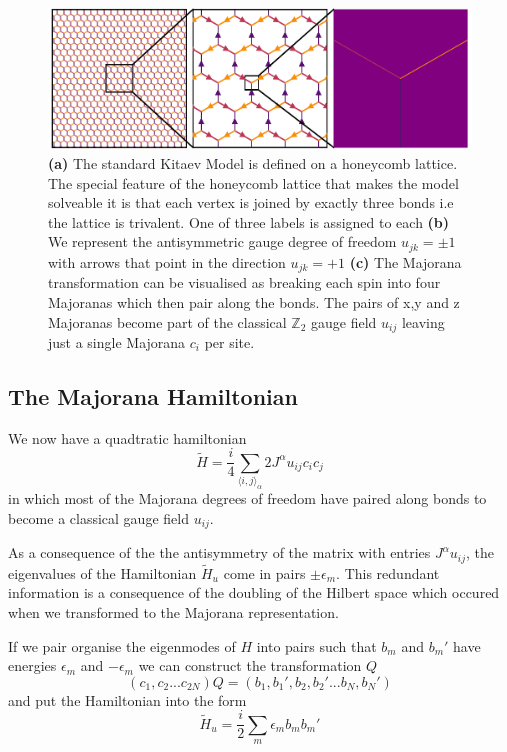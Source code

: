 \begin{figure}
\hypertarget{fig:intro_figure_template}{%
\centering
\includegraphics{figure_code/amk_chapter/honeycomb_zoom/intro_figure_template.pdf}
\caption{\textbf{(a)} The standard Kitaev Model is defined on a
honeycomb lattice. The special feature of the honeycomb lattice that
makes the model solveable it is that each vertex is joined by exactly
three bonds i.e the lattice is trivalent. One of three labels is
assigned to each \textbf{(b)} We represent the antisymmetric gauge
degree of freedom \(u_{jk} = \pm 1\) with arrows that point in the
direction \(u_{jk} = +1\) \textbf{(c)} The Majorana transformation can
be visualised as breaking each spin into four Majoranas which then pair
along the bonds. The pairs of x,y and z Majoranas become part of the
classical \(\mathbb{Z}_2\) gauge field \(u_{ij}\) leaving just a single
Majorana \(c_i\) per site.}\label{fig:intro_figure_template}
}
\end{figure}

\hypertarget{the-majorana-hamiltonian}{%
\subsection{The Majorana Hamiltonian}\label{the-majorana-hamiltonian}}

We now have a quadtratic hamiltonian
\[ \tilde{H} =  \frac{i}{4} \sum_{\langle i,j\rangle_\alpha} 2J^{\alpha} u_{ij} c_i c_j\]
in which most of the Majorana degrees of freedom have paired along bonds
to become a classical gauge field \(u_{ij}\).

As a consequence of the the antisymmetry of the matrix with entries
\(J^{\alpha} u_{ij}\), the eigenvalues of the Hamiltonian
\(\tilde{H}_u\) come in pairs \(\pm \epsilon_m\). This redundant
information is a consequence of the doubling of the Hilbert space which
occured when we transformed to the Majorana representation.

If we pair organise the eigenmodes of \(H\) into pairs such that \(b_m\)
and \(b_m'\) have energies \(\epsilon_m\) and \(-\epsilon_m\) we can
construct the transformation \(Q\)
\[(c_1, c_2... c_{2N}) Q = (b_1, b_1', b_2, b_2' ... b_{N}, b_{N}')\]
and put the Hamiltonian into the form
\[\tilde{H}_u = \frac{i}{2} \sum_m \epsilon_m b_m b_m'\]

